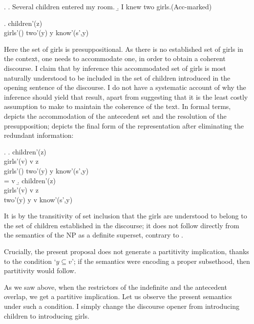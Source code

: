 \documentclass[11pt,a4paper]{article}
\begin{document}
\ex.
\a. Several children entered my room.
\b. I knew two girls.\hfill (Acc-marked)

\ex.
{children'(z)\\
girls'() \quad two'(y) \quad y \subseteq {} \quad know'(s',y)
}

Here the set of girls is presuppositional. As there is no established
set of girls in the context, one needs to accommodate one, in order to
obtain a coherent discourse. I claim that by inference this
accommodated set of girls is most naturally understood to be included
in the set of children introduced in the opening sentence of the
discourse. I do not have a systematic account of why the inference
should yield that result, apart from suggesting that it is the least
costly assumption to make to maintain the coherence of the text.  In
formal terms,  depicts the accommodation of the
antecedent set and the resolution of the presupposition;
 depicts the final form of the representation after
eliminating the redundant information:


\ex. 
\a.\label{prencaccom}
{children'(z)\\
girls'(v) \quad v \subseteq z\\
girls'() \quad two'(y) \quad y \subseteq {} \quad know'(s',y)\\
 = v
}
\b.\label{prencfin}
{children'(z)\\
girls'(v) \quad v \subseteq z\\
 two'(y) \quad y \subseteq v \quad know'(s',y)
}


It is by the transitivity of set inclusion that the girls are understood
to belong to the set of children established in the discourse; it does
not follow directly from the semantics of the NP as a definite
superset, contrary to \cite{enc91}. 

Crucially, the present proposal does not generate a partitivity
implication, thanks to the condition `$y\subseteq v$'; if the semantics
were encoding a proper subsethood, then partitivity would follow.

As we saw above, when the restrictors of the indefinite and the antecedent
overlap, we get a partitive implication. Let us observe the present
semantics under such a condition. I simply change the discourse opener
from introducing children to introducing girls.
\end{document}
